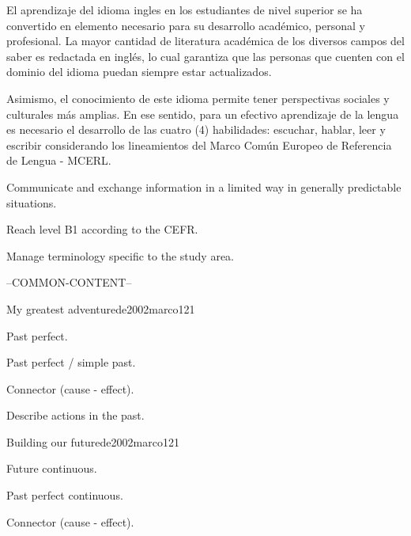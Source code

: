 \begin{syllabus}

\begin{justification}
El aprendizaje del idioma ingles en los estudiantes de nivel superior se ha 
convertido en elemento necesario para su desarrollo académico, personal y 
profesional. La mayor cantidad de literatura académica de los diversos 
campos del saber es redactada en inglés, lo cual garantiza que las personas 
que cuenten con el dominio del idioma puedan siempre estar actualizados. 

Asimismo, el conocimiento de este idioma permite tener perspectivas sociales y 
culturales más amplias. En ese sentido, para un efectivo aprendizaje de la 
lengua es necesario el desarrollo de las cuatro (4) habilidades: 
escuchar, hablar, leer y escribir considerando los lineamientos del 
Marco Común Europeo de Referencia de Lengua - MCERL.
\end{justification}

\begin{goals}
\item Communicate and exchange information in a limited way in generally predictable situations.
\item Reach level B1 according to the CEFR.
\item Manage terminology specific to the study area.
\end{goals}

--COMMON-CONTENT--

\begin{unit}{My greatest adventure}{}{de2002marco}{12}{1}
   \begin{topics}
      \item Past perfect.
      \item Past perfect / simple past.
      \item Connector (cause - effect).
   \end{topics}

   \begin{unitgoals}
      \item Describe actions in the past.
   \end{unitgoals}

\end{unit}

\begin{unit}{Building our future}{}{de2002marco}{12}{1}
   \begin{topics}
      \item Future continuous.
      \item Past perfect continuous.
      \item Connector (cause - effect).
   \end{topics}


\end{unit}
\end{syllabus}
